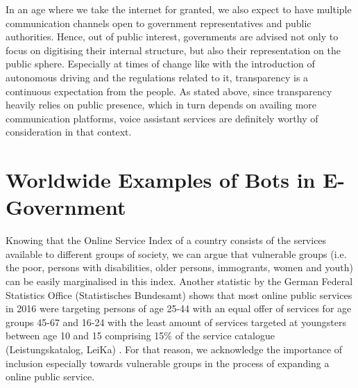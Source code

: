 In an age where we
take the internet for granted,
we also expect to have multiple communication channels open to government representatives and public authorities. 
%
Hence, out of public interest, governments are advised not only to focus on digitising their internal structure, but also their representation on the public sphere.
Especially at times of change like with the introduction of autonomous driving and the regulations related to it, transparency is a continuous expectation from the people. As stated above, since transparency heavily relies on public presence, which in turn depends on availing more communication platforms, voice assistant services are definitely worthy of consideration in that context.




\section{Worldwide Examples of Bots in E-Government}

Knowing that the Online Service Index of a country consists of the services available to different groups of society, we can argue that 
vulnerable groups (i.e. the poor, persons with disabilities, older persons, immogrants, women and youth) can be easily marginalised in this index. Another statistic by the German Federal Statistics Office (Statistisches Bundesamt) shows that most online public services in 2016 were targeting persons of age 25-44 with an equal offer of services for age groups 45-67 and 16-24 with the least amount of services targeted at youngsters between age 10 and 15 comprising 15\% of the service catalogue (Leistungskatalog, LeiKa) \cite{stabunda:leika}.
For that reason, we acknowledge the importance of inclusion especially towards vulnerable groups in the process of expanding a online public service.


